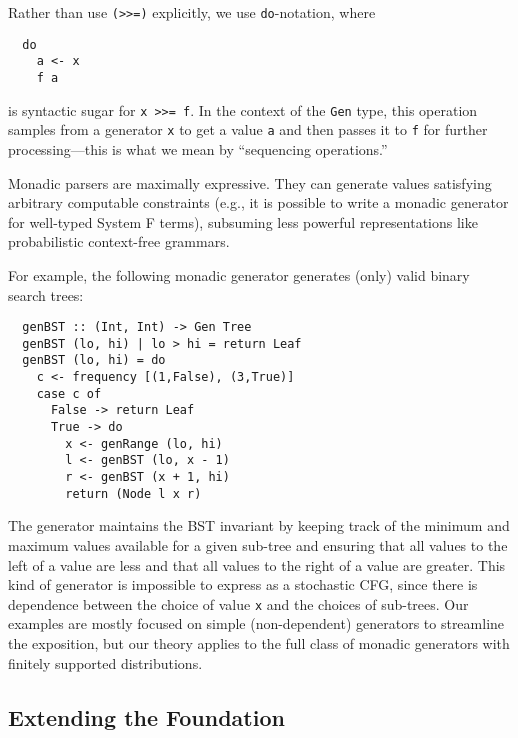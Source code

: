 Rather than use \lstinline{(>>=)} explicitly, we use \lstinline{do}-notation,
where
\begin{lstlisting}
  do
    a <- x
    f a
\end{lstlisting}
\noindent is syntactic sugar for \lstinline{x >>= f}. In the context of the
\lstinline{Gen} type, this operation samples from a generator \lstinline{x} to
get a value \lstinline{a} and then passes it to \lstinline{f} for further
processing---this is what we mean by ``sequencing operations.''

\smallskip

Monadic parsers are maximally expressive.  They can generate values satisfying
arbitrary computable constraints (e.g., it is possible to write a monadic
generator for well-typed System F terms), subsuming less powerful
representations like probabilistic context-free grammars.

For example, the following monadic generator generates (only) valid binary
search trees:
\begin{lstlisting}
  genBST :: (Int, Int) -> Gen Tree
  genBST (lo, hi) | lo > hi = return Leaf
  genBST (lo, hi) = do
    c <- frequency [(1,False), (3,True)]
    case c of
      False -> return Leaf
      True -> do
        x <- genRange (lo, hi)
        l <- genBST (lo, x - 1)
        r <- genBST (x + 1, hi)
        return (Node l x r)
\end{lstlisting}
\noindent The generator maintains the BST invariant by keeping track of the
minimum and maximum values available for a given sub-tree and ensuring that all
values to the left of a value are less and that all values to the right of a
value are greater.  This kind of generator is impossible to express as a
stochastic CFG, since there is dependence between the choice of value
\lstinline{x} and the choices of sub-trees. Our examples are mostly focused on
simple (non-dependent) generators to streamline the exposition, but our theory
applies to the full class of monadic generators with finitely supported
distributions.

%
%

\subsection{Extending the Foundation }

